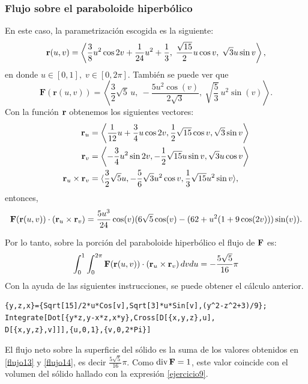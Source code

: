 \begin{parrafonumerado}
\subsubsection{Flujo sobre el paraboloide hiperbólico}

En este caso, la parametrización escogida es la siguiente:
\[
{\bf r}(u,v) =
\left\langle
\frac{3}{8}u^{2}\cos 2v + \frac{1}{24}u^{2} + \frac{1}{3},\;
\frac{\sqrt{15}}{2}u\cos v,\;
\sqrt{3}u\sin v
\right\rangle,
\]
en donde \( u \in [0,1],\; v \in [0,2\pi] \). También se puede ver que
\[
\mathbf{F}(\mathbf{r}(u,v)) =
\left\langle
\frac{3}{2}\sqrt{5}\,u,\
-\frac{5u^2\cos(v)}{2\sqrt{3}},\
\sqrt{\frac{5}{3}}\, u^2 \sin(v)
\right\rangle.
\]
Con la función ${\bf r}$ obtenemos los siguientes vectores:
\begin{align*}
{\bf r}_{u} &=\left\langle \frac{1}{12}u+\frac{3}{4}u\cos 2v,\frac{1}{2}\sqrt{15}\cos v,\sqrt{3}\sin v\right\rangle\\
{\bf r}_{v}&=\left\langle -\frac{3}{4}u^{2}\sin 2v,-\frac{1}{2}\sqrt{15}u\sin v,\sqrt{3}u\cos v\right\rangle \\
{\bf r}_{u}\times {\bf r}_{v}&= \langle \frac{3}{2}\sqrt{5}u,-\frac{5}{6}\sqrt{3} u^{2}\cos v,\frac{1}{3}\sqrt{15}u^{2}\sin v\rangle,
\end{align*}
entonces,
\begin{gather*}
{\bf F}({\bf r}(u,v)) \cdot \left({\bf r}_{u}\times {\bf r}_{v}\right)=\frac{5u^3}{24}\cos(v)(6\sqrt{5}\cos(v)-(62+u^2(1+9\cos(2v)))\sin(v)).
\end{gather*}

Por lo tanto, sobre la porción del paraboloide hiperbólico el flujo de ${\bf F}$ es:
\begin{equation} \label{flujo14}
\int_0^1\int_0^{2\pi}{\bf F}({\bf r}(u,v)) \cdot \left({\bf r}_{u}\times{\bf r}_{v}\right)dvdu=-\frac{5 \sqrt{5}}{16}\pi
\end{equation}
Con la ayuda de las siguientes instrucciones, se puede obtener el cálculo anterior.

\begin{tcolorbox}[title=\bf Instrucción \verb"Mathematica"]\begin{Verbatim}[formatcom=\letraverbatim]
{y,z,x}={Sqrt[15]/2*u*Cos[v],Sqrt[3]*u*Sin[v],(y^2-z^2+3)/9};
Integrate[Dot[{y*z,y-x*z,x*y},Cross[D[{x,y,z},u],
D[{x,y,z},v]]],{u,0,1},{v,0,2*Pi}]
\end{Verbatim}
\end{tcolorbox}

El flujo neto sobre la superficie del sólido es la suma de los valores obtenidos en \ref{flujo13} y
\ref{flujo14}, es decir $\frac{5 \sqrt{5}}{16} \pi$. Como $\operatorname{div}{\bf F}=1$,
este valor coincide con el volumen del sólido hallado con la expresión \ref{ejercicio9}.
\end{parrafonumerado}

